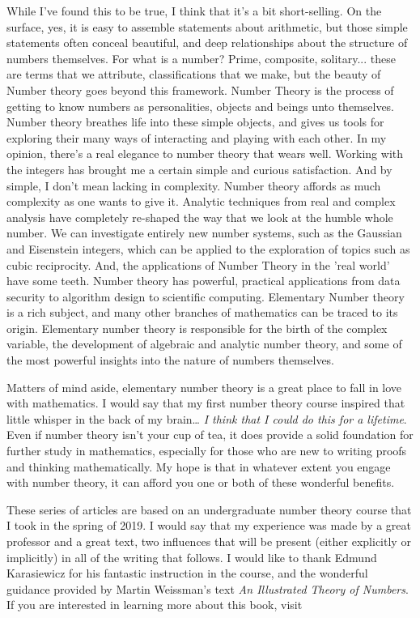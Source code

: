 \documentclass{article}
\begin{document}
While I’ve found this to be true, I think that it's a bit short-selling. On the surface, yes, it is easy to assemble statements about arithmetic, but those simple statements often conceal beautiful, and deep relationships about the structure of numbers themselves. For what is a number? Prime, composite, solitary... these are terms that we attribute, classifications that we make, but the beauty of Number theory goes beyond this framework. Number Theory is the process of getting to know numbers as personalities, objects and beings unto themselves. Number theory breathes life into these simple objects, and gives us tools for exploring their many ways of interacting and playing with each other. In my opinion, there’s a real elegance to number theory that wears well. Working with the integers has brought me a certain simple and curious satisfaction. And by simple, I don’t mean lacking in complexity. Number theory affords as much complexity as one wants to give it. Analytic techniques from real and complex analysis have completely re-shaped the way that we look at the humble whole number. We can investigate entirely new number systems, such as the Gaussian and Eisenstein integers, which can be applied to the exploration of topics such as cubic reciprocity. And, the applications of Number Theory in the 'real world' have some teeth. Number theory has powerful, practical applications from data security to algorithm design to scientific computing. 
Elementary Number theory is a rich subject, and many other branches of mathematics can be traced to its origin. Elementary number theory is responsible for the birth of the complex variable, the development of algebraic and analytic number theory, and some of the most powerful insights into the nature of numbers themselves. 
\begin{mdframed} 
Matters of mind aside, elementary number theory is a great place to fall in love with mathematics. I would say that my first number theory course inspired that little whisper in the back of my brain… \textit{I think that I could do this for a lifetime}. Even if number theory isn't your cup of tea, it does provide a solid foundation for further study in mathematics, especially for those who are new to writing proofs and thinking mathematically. My hope is that in whatever extent you engage with number theory, it can afford you one or both of these wonderful benefits. 
\end{mdframed}
These series of articles are based on an undergraduate number theory course that I took in the spring of 2019. I would say that my experience was made by a great professor and a great text, two influences that will be present (either explicitly or implicitly) in all of the writing that follows. I would like to thank Edmund Karasiewicz for his fantastic instruction in the course, and the wonderful guidance provided by Martin Weissman’s text \textit{An Illustrated Theory of Numbers}. If you are interested in learning more about this book, visit 
\end{document}
